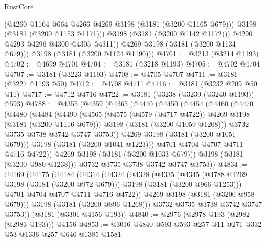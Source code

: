 \begin{lexlean}{RustCore}
\begin{coremodule}
                (@4260 @1164 @664 @4266 @4269 @3198 (@3181 (@3200 @1165 @679)))
                @3198
                (@3181 (@3200 @1153 @1171)))
              @3198
              (@3181 (@3200 @1142 @1172)))
            @4290
            @4293
            @4296
            @4300
            @4305
            @4311))
        @4269
        @3198
        (@3181 (@3200 @1134 @679)))
      @3198
      (@3181 (@3200 @1124 @1190)))
@4701 := @3213 (@3214 @1193)
@4702 := @4699 @4701
@4704 := @3181 (@3218 @1193)
@4705 := @4702 @4704
@4707 := @3181 (@3223 @1193)
@4708 := @4705 @4707
@4711 := @3181 (@3227 @1193 @50)
@4712 := @4708 @4711
@4716 := @3181 (@3232 @209 @50 @11)
@4717 := @4712 @4716
@4722 := @3181 (@3238 (@3239 (@3240 @1193)) @593)
@4788 := @4355
    (@4359
      (@4365
        (@4440
          (@4450
            (@4454
              (@4460
                (@4470
                  (@4480
                    (@4484
                      (@4490
                        (@4565
                          (@4575 (@4579 (@4717 @4722)) @4269 @3198 (@3181 (@3200 @1116 @679)))
                          @3198
                          (@3181 (@3200 @1059 @1208)))
                        @3732
                        @3735
                        @3738
                        @3742
                        @3747
                        @3753))
                    @4269
                    @3198
                    (@3181 (@3200 @1051 @679)))
                  @3198
                  (@3181 (@3200 @1041 @1223)))
                @4701
                @4704
                @4707
                @4711
                @4716
                @4722))
            @4269
            @3198
            (@3181 (@3200 @1033 @679)))
          @3198
          (@3181 (@3200 @980 @1238)))
        @3732
        @3735
        @3738
        @3742
        @3747
        @3753))
@4834 := @4169
    (@4175
      (@4184
        (@4314
          (@4324
            (@4328
              (@4335
                (@4345
                  (@4788 @4269 @3198 (@3181 (@3200 @972 @679)))
                  @3198
                  (@3181 (@3200 @966 @1253)))
                @4701
                @4704
                @4707
                @4711
                @4716
                @4722))
            @4269
            @3198
            (@3181 (@3200 @958 @679)))
          @3198
          (@3181 (@3200 @896 @1268)))
        @3732
        @3735
        @3738
        @3742
        @3747
        @3753))
    (@3181 (@3301 @4156 @193))
@4840 := @2976 (@2978 @193 (@2982 (@2983 @193))) @4156
@4853 := @3016 @4840 @593 @593 @257 @11 @271 @332 @53 @1336 @257 @646 @1385 @1581

\end{coremodule}
\end{lexlean}
